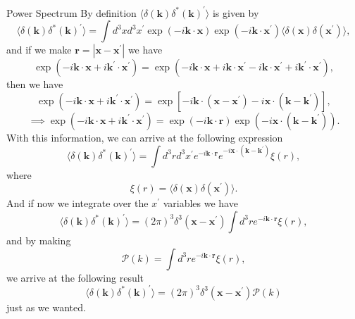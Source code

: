 \documentclass[11pt]{article}
\begin{document}
\newpage
\begin{problem}
Power Spectrum
\newline
By definition $\langle\delta(\mathbf{k})\delta^{*}(\mathbf{k})^\prime\rangle$ is given by
\begin{displaymath}
\langle\delta(\mathbf{k})\delta^{*}(\mathbf{k})^\prime\rangle = \int d^3 xd^3 x^{\prime} \exp(-i\mathbf{k}\cdot \mathbf{x})\exp(-i\mathbf{k}\cdot \mathbf{x}^\prime)\langle\delta(\mathbf{x})\delta(\mathbf{x^\prime})\rangle,
\end{displaymath}
and if we make $\mathbf{r} = |\mathbf{x}-\mathbf{x}^\prime|$ we have
\begin{displaymath}
\exp(-i\mathbf{k}\cdot\mathbf{x}+i\mathbf{k}^\prime\cdot\mathbf{x}^\prime) = \exp(-i\mathbf{k}\cdot\mathbf{x} + i\mathbf{k}\cdot\mathbf{x}^\prime -i\mathbf{k}\cdot\mathbf{x}^\prime + i\mathbf{k}^\prime\cdot\mathbf{x}^\prime),
\end{displaymath}
then we have
\begin{displaymath}
\exp(-i\mathbf{k}\cdot\mathbf{x}+i\mathbf{k}^\prime\cdot\mathbf{x}^\prime) = \exp[-i\mathbf{k}\cdot(\mathbf{x}-\mathbf{x}^\prime)-i\mathbf{x}\cdot(\mathbf{k}-\mathbf{k}^\prime)],  
\end{displaymath}
\begin{displaymath}
\implies \exp(-i\mathbf{k}\cdot\mathbf{x}+i\mathbf{k}^\prime\cdot\mathbf{x}^\prime) = \exp(-i\mathbf{k}\cdot\mathbf{r})\exp(-i\mathbf{x}\cdot(\mathbf{k}-\mathbf{k}^\prime)). 
\end{displaymath}
With this information, we can arrive at the following expression
\begin{displaymath}
\langle\delta(\mathbf{k})\delta^{*}(\mathbf{k})^\prime\rangle = \int d^3 rd^3 x^\prime e^{-i\mathbf{k}\cdot\mathbf{r}}e^{-i\mathbf{x}\cdot(\mathbf{k}-\mathbf{k}^\prime)}\xi(r),
\end{displaymath}
where
\begin{displaymath}
  \xi(r) = \langle\delta(\mathbf{x})\delta(\mathbf{x^\prime})\rangle.
\end{displaymath}
And if now we integrate over the $x^\prime$ variables we have
\begin{displaymath}
\langle\delta(\mathbf{k})\delta^{*}(\mathbf{k})^\prime\rangle = (2\pi)^3\delta^{3}(\mathbf{x}-\mathbf{x}^\prime)\int d^3 r e^{-i\mathbf{k}\cdot\mathbf{r}}\xi(r),
\end{displaymath}
and by making
\begin{displaymath}
  \mathcal{P}(k) = \int d^3 r e^{-i\mathbf{k}\cdot\mathbf{r}}\xi(r),
\end{displaymath}
we arrive at the following result
\begin{displaymath}
\langle\delta(\mathbf{k})\delta^{*}(\mathbf{k})^\prime\rangle = (2\pi)^3\delta^{3}(\mathbf{x}-\mathbf{x}^\prime)\mathcal{P}(k)
\end{displaymath}
just as we wanted.
\end{problem}
\end{document}
